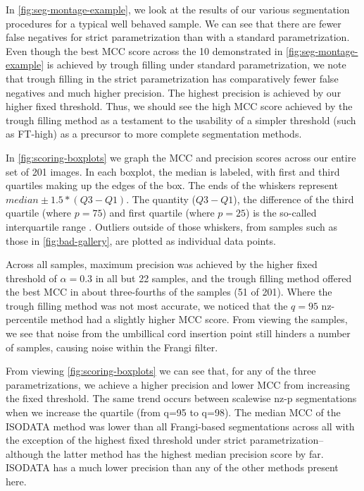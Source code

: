 In \cref{fig:seg-montage-example}, we look at the results of our various segmentation procedures for a typical well behaved sample. We can see that there are fewer false negatives for strict parametrization than with a standard parametrization. Even though the best MCC score across the 10 demonstrated in \cref{fig:seg-montage-example} is achieved by trough filling under standard parametrization, we note that trough filling in the strict parametrization has comparatively fewer false negatives and much higher precision. The highest precision is achieved by our higher fixed threshold. Thus, we should see the high MCC score achieved by the trough filling method as a testament to the usability of a simpler threshold (such as FT-high) as a precursor to more complete segmentation methods.


In \cref{fig:scoring-boxplots} we graph the MCC and precision scores across our entire set of 201 images. In each boxplot, the median is labeled, with first and third quartiles making up the edges of the box. The ends of the whiskers represent  $median \pm 1.5*(Q3-Q1)$. The quantity ($Q3-Q1$), the difference of the third quartile (where $p=75$) and first quartile (where $p=25$) is the so-called interquartile range \cite{scipy}. Outliers outside of those whiskers, from samples such as those in \cref{fig:bad-gallery}, are plotted as individual data points.

Across all samples, maximum precision was achieved by the higher fixed threshold of $\alpha =0.3 $ in all but 22 samples, and the trough filling method offered the best MCC in about three-fourths of the samples (51 of 201). Where the trough filling method was not most accurate, we noticed that the $q=95 $ nz-percentile method had a slightly higher MCC score. From viewing the samples, we see that noise from the umbillical cord insertion point still hinders a number of samples, causing noise within the Frangi filter. 

From viewing \cref{fig:scoring-boxplots} we can see that, for any of the
three parametrizations, we achieve a higher precision and lower MCC from increasing the fixed threshold. The same trend occurs between scalewise nz-p segmentations when we increase the quartile (from q=95 to q=98). The median MCC of the ISODATA method was lower than all Frangi-based segmentations across all with the exception of the highest fixed threshold under strict parametrization--although the latter method has the highest median precision score by far. ISODATA has a much lower precision than any of the other methods present here.

